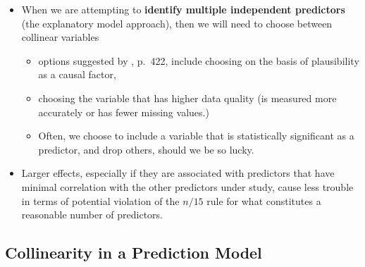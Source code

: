 \documentclass[]{book}
\providecommand{\tightlist}{%
  \setlength{\itemsep}{0pt}\setlength{\parskip}{0pt}}
\theoremstyle{definition}
\theoremstyle{definition}
\theoremstyle{definition}
\theoremstyle{remark}
\begin{document}
\begin{itemize}
\tightlist
\item
  When we are attempting to \textbf{identify multiple independent
  predictors} (the explanatory model approach), then we will need to
  choose between collinear variables

  \begin{itemize}
  \tightlist
  \item
    options suggested by \citet{Vittinghoff2012}, p.~422, include
    choosing on the basis of plausibility as a causal factor,
  \item
    choosing the variable that has higher data quality (is measured more
    accurately or has fewer missing values.)
  \item
    Often, we choose to include a variable that is statistically
    significant as a predictor, and drop others, should we be so lucky.
  \end{itemize}
\item
  Larger effects, especially if they are associated with predictors that
  have minimal correlation with the other predictors under study, cause
  less trouble in terms of potential violation of the \(n/15\) rule for
  what constitutes a reasonable number of predictors.
\end{itemize}

\subsection{Collinearity in a Prediction
Model}\label{collinearity-in-a-prediction-model}
\end{document}
